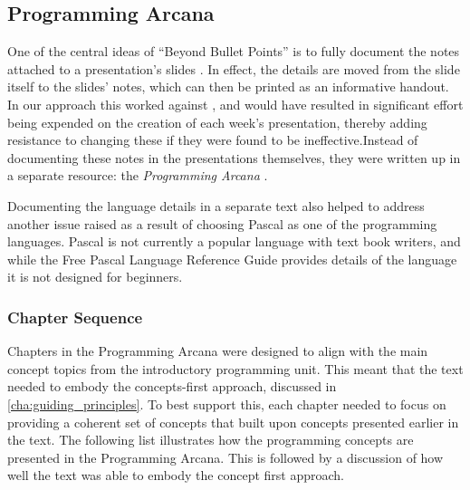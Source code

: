
\subsection{Programming Arcana} %
\label{sub:programming_arcana}

One of the central ideas of ``Beyond Bullet Points'' is to fully document the notes attached to a presentation's slides \cite{Atkinson:2007}. In effect, the details are moved from the slide itself to the slides' notes, which can then be printed as an informative handout. In our approach this worked against , and would have resulted in significant effort being expended on the creation of each week's presentation, thereby adding resistance to changing these if they were found to be ineffective.Instead of documenting these notes in the presentations themselves, they were written up in a separate resource: the \emph{Programming Arcana} \cite{Cain:2013arcana}.

Documenting the language details in a separate text also helped to address another issue raised as a result of choosing Pascal as one of the programming languages. Pascal is not currently a popular language with text book writers, and while the Free Pascal Language Reference Guide \cite{FPC:2013lang} provides details of the language it is not designed for beginners.


\subsubsection{Chapter Sequence} %
\label{ssub:chapter_sequence}

Chapters in the Programming Arcana were designed to align with the main concept topics from the introductory programming unit. This meant that the text needed to embody the concepts-first approach,  discussed in \cref{cha:guiding_principles}. To best support this, each chapter needed to focus on providing a coherent set of concepts that built upon concepts presented earlier in the text. The following list illustrates how the programming concepts are presented in the Programming Arcana. This is followed by a discussion of how well the text was able to embody the concept first approach.

